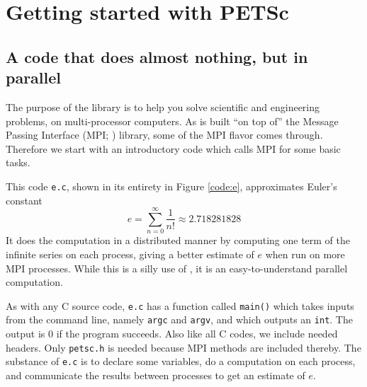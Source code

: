 
\chapter{Getting started with PETSc}
\label{chap:getstarted}

\section{A code that does almost nothing, but in parallel}

The purpose of the \PETSc library is to help you solve scientific and engineering problems, on multi-processor computers.  As \PETSc is built ``on top of'' the Message Passing Interface (MPI; \citep{Groppetal1999}) library, some of the MPI flavor comes through.  Therefore we start with an introductory \PETSc code which calls MPI for some basic tasks.

This code \texttt{e.c}, shown in its entirety in Figure \ref{code:e}, approximates Euler's constant
\begin{equation}
e = \sum_{n = 0}^\infty \frac{1}{n!} \approx 2.718281828 \label{introeseries}
\end{equation}
It does the computation in a distributed manner by computing one term of the infinite series on each process, giving a better estimate of $e$ when run on more MPI processes. While this is a silly use of \PETSc, it is an easy-to-understand parallel computation.

As with any C source code, \texttt{e.c} has a function called \texttt{main()} which takes inputs from the command line, namely \texttt{argc} and \texttt{argv}, and which outputs an \texttt{int}.  The output is $0$ if the program succeeds.  Also like all C codes, we include needed headers.  Only \texttt{petsc.h} is needed because MPI methods are included thereby.  The substance of \texttt{e.c} is to declare some variables, do a computation on each process, and communicate the results between processes to get an estimate of $e$.

